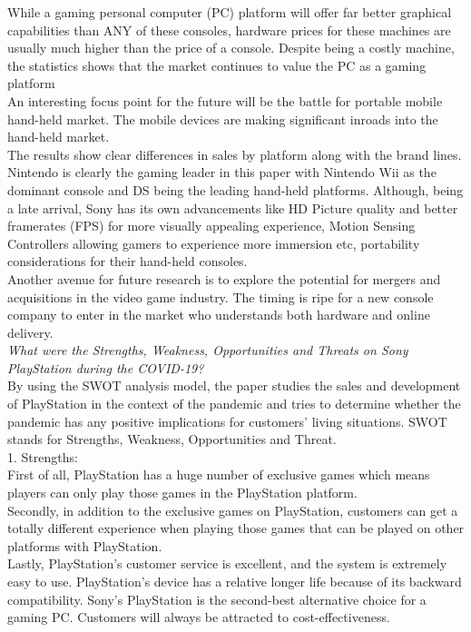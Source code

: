 \documentclass[conference]{IEEEtran}
\begin{document}
While a gaming personal computer (PC) platform will offer far better graphical capabilities than ANY of these consoles, hardware prices for these machines are usually much higher than the price of a console. Despite being a costly machine, the statistics shows that the market continues to value the PC as a gaming platform\\
An interesting focus point for the future will be the battle for portable mobile hand-held market. The mobile devices are making significant inroads into the hand-held market.\\
The results show clear differences in sales by platform along with the brand lines. Nintendo is clearly the gaming leader in this paper with Nintendo Wii as the dominant console and DS being the leading hand-held platforms. Although, being a late arrival, Sony has its own advancements like HD Picture quality and better framerates (FPS) for more visually appealing experience, Motion Sensing Controllers allowing gamers to experience more immersion etc, portability considerations for their hand-held consoles. \\
Another avenue for future research is to explore the potential for mergers and acquisitions in the video game industry. The timing is ripe for a new console company to enter in the market who understands both hardware and online delivery.\\
\hfill \break
\textit{What were the Strengths, Weakness, Opportunities and Threats on Sony PlayStation during the COVID-19?}\\
By using the SWOT analysis model, the paper studies the sales and development of PlayStation in the context of the pandemic and tries to determine whether the pandemic has any positive implications for customers' living situations. SWOT stands for Strengths, Weakness, Opportunities and Threat.\\
1. Strengths:\\
First of all, PlayStation has a huge number of exclusive games which means players can only play those games in the PlayStation platform.\\
Secondly, in addition to the exclusive games on PlayStation, customers can get a totally different experience when playing those games that can be played on other platforms with PlayStation.\\
Lastly, PlayStation's customer service is excellent, and the system is extremely easy to use. PlayStation's device has a relative longer life because of its backward compatibility. Sony’s PlayStation is the second-best alternative choice for a gaming PC. Customers will always be attracted to cost-effectiveness. \\
\end{document}

